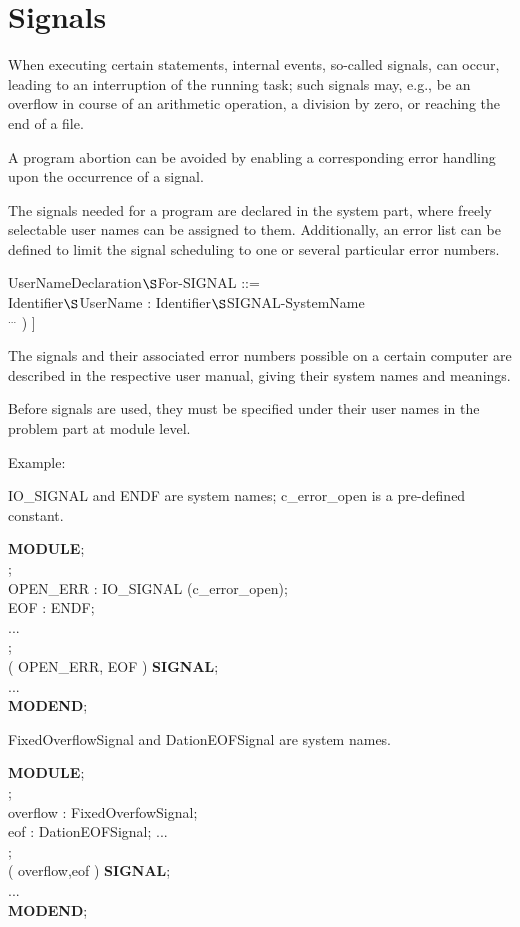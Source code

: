 \chapter{Signals}   %
\label{signals}

When executing certain statements, internal events, so-called signals,
can occur, leading to an interruption of the running task; such signals
may, e.g., be an overflow in course of an arithmetic operation, a
division by zero, or reaching the end of a file.

A program abortion can be avoided by enabling a corresponding error
handling upon the occurrence of a signal.

The signals needed for a program are declared in the system part, where
freely selectable user names can be assigned to them. Additionally, an
error list can be defined to limit the signal scheduling to one or
several particular error numbers.

UserNameDeclaration$\S $For-SIGNAL ::= \\
\x Identifier$\S $UserName : Identifier$\S $SIGNAL-SystemName\\
\x \x [ ( Identifier$\S $ErrorNumber [ , Identifier$\S $ErrorNumber ] $^{...}$ ) ]

The signals and their associated error numbers possible on a certain
computer are described in the respective user manual, giving their
system names and meanings.

Before signals are used, they must be specified under their user names
in the problem part at module level.

Example:

\begin{removed}
IO\_SIGNAL and ENDF are system names; c\_error\_open is a pre-defined
constant.

{\bf MODULE};\\
;\\
\x \x OPEN\_ERR : IO\_SIGNAL (c\_error\_open);\\
\x \x EOF : ENDF;\\
\x \x ...\\
;\\
\x {} ( OPEN\_ERR, EOF ) {\bf SIGNAL};\\
\x \x ... \\
{\bf MODEND};
\end{removed}
\begin{added}
FixedOverflowSignal and DationEOFSignal are system names.

{\bf MODULE};\\
;\\
\x \x overflow : FixedOverfowSignal;\\
\x \x eof : DationEOFSignal;
\x \x ...\\
;\\
\x {} ( overflow,eof ) {\bf SIGNAL};\\
\x \x ... \\
{\bf MODEND};
\end{added}

